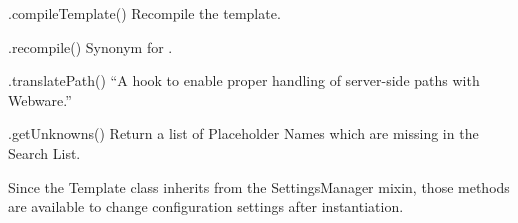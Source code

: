 \begin{description}
\item{.compileTemplate()}  Recompile the template.  

\item{.recompile()}  Synonym for .

\item{.translatePath()}  ``A hook to enable proper handling of server-side
     paths with Webware.''
     
\item{.getUnknowns()}  Return a list of Placeholder Names which are missing in
     the Search List.

\end{description}

Since the Template class inherits from the SettingsManager mixin, those methods
are available to change configuration settings after instantiation.

